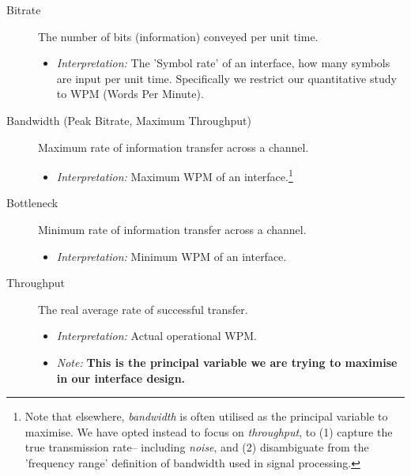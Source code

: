 \documentclass[logo,bsc,singlespacing,parskip]{infthesis}
\begin{document}
{ %
\begin{mdframed}
\begin{description}
\item[{Bitrate\label{bitrate}}] The number of bits (information) conveyed per unit time.
\begin{itemize}
\item \emph{Interpretation:} The 'Symbol rate' of an interface, how many symbols are input per unit time. Specifically we restrict our quantitative study to WPM (Words Per Minute).
\end{itemize}
\end{description}
\end{mdframed}

\begin{mdframed}
\begin{description}
\item[{Bandwidth\label{bandwidth} (Peak Bitrate, Maximum Throughput)}] Maximum rate of information transfer across a channel.
\begin{itemize}
\item \emph{Interpretation:} Maximum WPM of an interface.\footnote{Note that elsewhere, \emph{bandwidth} is often utilised as the principal variable to maximise. We have opted instead to focus on \emph{throughput}, to (1) capture the true transmission rate-- including \emph{noise}, and (2) disambiguate from the 'frequency range' definition of bandwidth used in signal processing.}
\end{itemize}
\end{description}
\end{mdframed}

\begin{mdframed}
\begin{description}
\item[{Bottleneck\label{bottleneck}}] Minimum rate of information transfer across a channel.
\begin{itemize}
\item \emph{Interpretation:} Minimum WPM of an interface.
\end{itemize}
\end{description}
\end{mdframed}

\begin{mdframed}
\begin{description}
\item[{Throughput}] The real average rate of successful transfer.
\begin{itemize}
\item \emph{Interpretation:} Actual operational WPM.
\item \emph{Note:} \textbf{This is the principal variable we are trying to maximise in our interface design.}
\end{itemize}
\end{description}
\end{mdframed}

}
\end{document}

